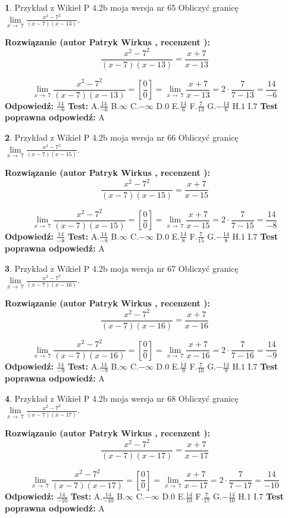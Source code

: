 \documentclass[12pt, a4paper]{article}
\theoremstyle{definition} %
\newtheorem{zad}{}
\newcommand{\zadStart}[1]{\begin{zad}#1\newline}
\newcommand{\zadStop}{\end{zad}}
\newcommand{\rozwStart}[2]{\noindent \textbf{Rozwiązanie (autor #1 , recenzent #2): }\newline}
\newcommand{\rozwStop}{\newline}
\newcommand{\odpStart}{\noindent \textbf{Odpowiedź:}\newline}
\newcommand{\odpStop}{\newline}
\newcommand{\testStart}{\noindent \textbf{Test:}\newline}
\newcommand{\testStop}{\newline}
\newcommand{\kluczStart}{\noindent \textbf{Test poprawna odpowiedź:}\newline}
\newcommand{\kluczStop}{\newline}
\begin{document}
\zadStart{Przykład z Wikieł P 4.2b moja wersja nr 65}
Obliczyć granicę $\lim\limits_{x\to\ 7}\frac{x^{2}-7^{2}}{(x-7)(x-13)}$.
\zadStop
\rozwStart{Patryk Wirkus}{}
$$\frac{x^{2}-7^{2}}{(x-7)(x-13)}=\frac{x+7}{x-13}$$

$$\lim\limits_{x\to\ 7}\frac{x^{2}-7^{2}}{(x-7)(x-13)}=[\frac{0}{0}]=\lim\limits_{x\to\ 7}\frac{x+7}{x-13}=2 \cdot \frac{7}{7-13} = \frac{14}{-6}$$
\rozwStop
\odpStart
$\frac{14}{-6}$
\odpStop
\testStart
A.$\frac{14}{-6}$
B.$\infty$
C.$-\infty$
D.$0$
E.$\frac{14}{6}$
F.$\frac{7}{13}$
G.$-\frac{14}{6}$
H.$1$
I.$7$
\testStop
\kluczStart
A
\kluczStop



\zadStart{Przykład z Wikieł P 4.2b moja wersja nr 66}
Obliczyć granicę $\lim\limits_{x\to\ 7}\frac{x^{2}-7^{2}}{(x-7)(x-15)}$.
\zadStop
\rozwStart{Patryk Wirkus}{}
$$\frac{x^{2}-7^{2}}{(x-7)(x-15)}=\frac{x+7}{x-15}$$

$$\lim\limits_{x\to\ 7}\frac{x^{2}-7^{2}}{(x-7)(x-15)}=[\frac{0}{0}]=\lim\limits_{x\to\ 7}\frac{x+7}{x-15}=2 \cdot \frac{7}{7-15} = \frac{14}{-8}$$
\rozwStop
\odpStart
$\frac{14}{-8}$
\odpStop
\testStart
A.$\frac{14}{-8}$
B.$\infty$
C.$-\infty$
D.$0$
E.$\frac{14}{8}$
F.$\frac{7}{15}$
G.$-\frac{14}{8}$
H.$1$
I.$7$
\testStop
\kluczStart
A
\kluczStop



\zadStart{Przykład z Wikieł P 4.2b moja wersja nr 67}
Obliczyć granicę $\lim\limits_{x\to\ 7}\frac{x^{2}-7^{2}}{(x-7)(x-16)}$.
\zadStop
\rozwStart{Patryk Wirkus}{}
$$\frac{x^{2}-7^{2}}{(x-7)(x-16)}=\frac{x+7}{x-16}$$

$$\lim\limits_{x\to\ 7}\frac{x^{2}-7^{2}}{(x-7)(x-16)}=[\frac{0}{0}]=\lim\limits_{x\to\ 7}\frac{x+7}{x-16}=2 \cdot \frac{7}{7-16} = \frac{14}{-9}$$
\rozwStop
\odpStart
$\frac{14}{-9}$
\odpStop
\testStart
A.$\frac{14}{-9}$
B.$\infty$
C.$-\infty$
D.$0$
E.$\frac{14}{9}$
F.$\frac{7}{16}$
G.$-\frac{14}{9}$
H.$1$
I.$7$
\testStop
\kluczStart
A
\kluczStop



\zadStart{Przykład z Wikieł P 4.2b moja wersja nr 68}
Obliczyć granicę $\lim\limits_{x\to\ 7}\frac{x^{2}-7^{2}}{(x-7)(x-17)}$.
\zadStop
\rozwStart{Patryk Wirkus}{}
$$\frac{x^{2}-7^{2}}{(x-7)(x-17)}=\frac{x+7}{x-17}$$

$$\lim\limits_{x\to\ 7}\frac{x^{2}-7^{2}}{(x-7)(x-17)}=[\frac{0}{0}]=\lim\limits_{x\to\ 7}\frac{x+7}{x-17}=2 \cdot \frac{7}{7-17} = \frac{14}{-10}$$
\rozwStop
\odpStart
$\frac{14}{-10}$
\odpStop
\testStart
A.$\frac{14}{-10}$
B.$\infty$
C.$-\infty$
D.$0$
E.$\frac{14}{10}$
F.$\frac{7}{17}$
G.$-\frac{14}{10}$
H.$1$
I.$7$
\testStop
\kluczStart
A
\kluczStop
\end{document}
